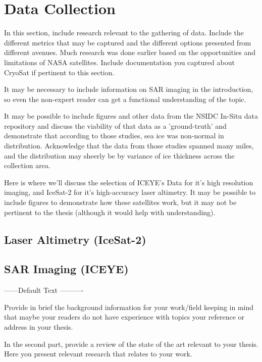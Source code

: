 \chapter{Data Collection}
\label{sec:Data_Collection}

  
In this section, include research relevant to the gathering of data. Include the different metrics that may be captured and the different options presented from different avenues. Much research was done earlier based on the opportunities and limitations of NASA satellites. Include documentation you captured about CryoSat if pertinent to this section.

It may be necessary to include information on SAR imaging in the introduction, so even the non-expert reader can get a functional understanding of the topic.

It may be possible to include figures and other data from the NSIDC In-Situ data repository and discuss the viability of that data as a 'ground-truth' and demonstrate that according to those studies, sea ice was non-normal in distribution. Acknowledge that the data from those studies spanned many miles, and the distribution may sheerly be by variance of ice thickness across the collection area.

Here is where we'll discuss the selection of ICEYE's Data for it's high resolution imaging, and IceSat-2 for it's high-accuracy laser altimetry. It may be possible to include figures to demonstrate how these satellites work, but it may not be pertinent to the thesis (although it would help with understanding).

\section {Laser Altimetry (IceSat-2)}

\section {SAR Imaging (ICEYE)}

------Default Text ----------

Provide in brief the background information for your work/field keeping in mind that maybe your readers do not have experience with topics your reference or address in your thesis. 

In the second part, provide a review of the state of the art relevant to your thesis. Here you present relevant research that relates to your work. 
